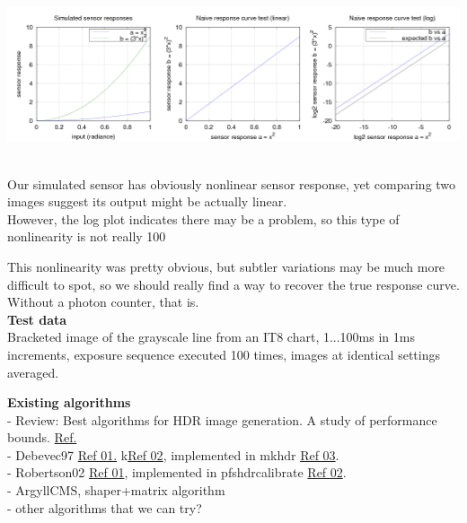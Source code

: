 \begin{center}
\includegraphics[height=5cm]{images/naive}
\end{center}

Our simulated sensor has obviously nonlinear sensor response, yet comparing two images suggest its output might be actually linear.\\

However, the log plot indicates there may be a problem, so this type of nonlinearity is not really 100%

This nonlinearity was pretty obvious, but subtler variations may be much more difficult to spot, so we should really find a way to recover the true response curve. Without a photon counter, that is. \\

\textbf{Test data}\\

Bracketed image of the grayscale line from an IT8 chart, 1...100ms in 1ms increments, exposure sequence executed 100 times, images at identical settings averaged. 

\begin{center}
\end{center}

\textbf{Existing algorithms}\\

- Review: Best algorithms for HDR image generation. A study of performance bounds. \href{https://hal.archives-ouvertes.fr/file/index/docid/733853/filename/best_hdr_algo_hal.pdf}{Ref.}\\
- Debevec97 \href{http://www.pauldebevec.com/Research/HDR/debevec-siggraph97.pdf}{Ref 01.} k\href{http://pages.cs.wisc.edu/~csverma/CS766_09/HDRI/hdr.html}{Ref 02}, implemented in mkhdr \href{http://duikerresearch.com/mkhdr-archive/}{Ref 03}.\\
- Robertson02 \href{http://pages.cs.wisc.edu/~lizhang/courses/cs766-2008f/projects/hdr/Robertson2003ETA.pdf}{Ref 01}, implemented in pfshdrcalibrate \href{http://resources.mpi-inf.mpg.de/hdr/calibration/pfs.html}{Ref 02}.\\
- ArgyllCMS, shaper+matrix algorithm\\
- other algorithms that we can try? \\


